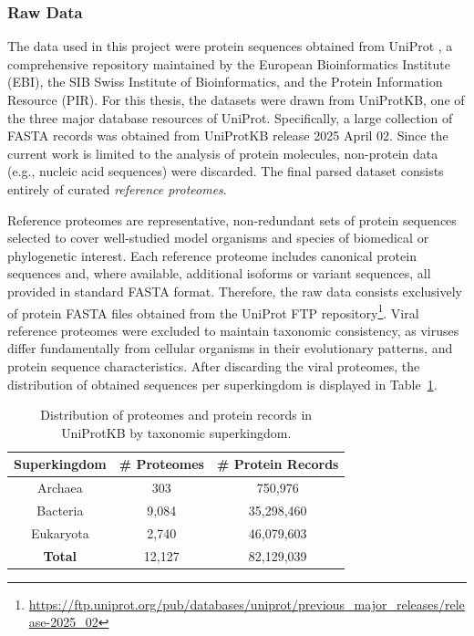 \subsubsection{Raw Data}

The data used in this project were protein sequences obtained from UniProt
\cite{uniprot}, a comprehensive repository maintained by the European
Bioinformatics Institute (EBI), the SIB Swiss Institute of Bioinformatics, and
the Protein Information Resource (PIR). For this thesis, the datasets were
drawn from UniProtKB, one of the three major database resources of UniProt.
Specifically, a large collection of FASTA records was obtained from UniProtKB
release 2025 April 02. Since the current work is limited to the analysis of
protein molecules, non-protein data (e.g., nucleic
acid sequences) were discarded. The final parsed dataset consists entirely of
curated \textit{reference proteomes}.

Reference proteomes are representative, non-redundant sets of protein sequences
selected to cover well-studied model organisms and species of biomedical or
phylogenetic interest. Each reference proteome includes canonical protein
sequences and, where available, additional isoforms or variant sequences, all
provided in standard FASTA format. Therefore, the raw data consists
exclusively of protein FASTA files obtained from the UniProt FTP
repository\footnote{\url{https://ftp.uniprot.org/pub/databases/uniprot/previous_major_releases/release-2025_02}}.
Viral reference proteomes were excluded to maintain taxonomic consistency, as
viruses differ fundamentally from cellular organisms in their evolutionary
patterns, and protein sequence characteristics. After discarding the viral proteomes, the distribution of obtained sequences per superkingdom is displayed in Table~\ref{tab:superkingdomDistribution}.

\begin{table}[htbp]
	\centering
	\caption{Distribution of proteomes and protein records in UniProtKB by taxonomic superkingdom.}
	\begin{tabular}{ccc}
		\toprule
		\textbf{Superkingdom} & \textbf{\# Proteomes} & \textbf{\# Protein Records} \\
		\midrule
		\arrayrulecolor{gray!50}
		Archaea & 303 & 750,976 \\
    \midrule
		Bacteria & 9,084 & 35,298,460 \\
		\midrule
		Eukaryota & 2,740 & 46,079,603 \\
		\arrayrulecolor{black}
		\midrule
		\textbf{Total} & 12,127 & 82,129,039 \\
    \bottomrule
	\end{tabular}
	\label{tab:superkingdomDistribution}
\end{table}

